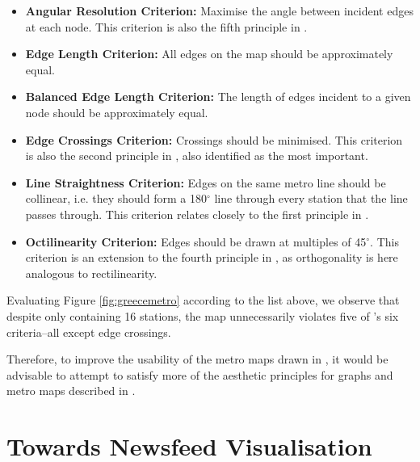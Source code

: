 \begin{itemize}
	\item \textbf{Angular Resolution Criterion:} Maximise the angle between incident edges at each node. This criterion is also the fifth principle in \citep{TheBasisForGraphDrawingAlgorithms}. 
	\item \textbf{Edge Length Criterion:} All edges on the map should be approximately equal.
	\item \textbf{Balanced Edge Length Criterion:} The length of edges incident to a given node should be approximately equal.
	\item \textbf{Edge Crossings Criterion:} Crossings should be minimised. This criterion is also the second principle in \citep{TheBasisForGraphDrawingAlgorithms}, also identified as the most important.
	\item \textbf{Line Straightness Criterion:} Edges on the same metro line should be collinear, i.e. they should form a 180$^{\circ}$ line through every station that the line passes through. This criterion relates closely to the first principle in \citep{TheBasisForGraphDrawingAlgorithms}.
	\item \textbf{Octilinearity Criterion:} Edges should be drawn at multiples of 45$^{\circ}$. This criterion is an extension to the fourth principle in \citep{TheBasisForGraphDrawingAlgorithms}, as orthogonality is here analogous to rectilinearity.
\end{itemize}

Evaluating Figure \ref{fig:greecemetro} according to the list above, we observe that despite only containing 16 stations, the map unnecessarily violates five  of \citeauthor{AutomaticMetroMapLayout}'s six criteria--all except edge crossings.

Therefore, to improve the usability of the metro maps drawn in \citep{ConnectingTheDots, GeneratingInformationMaps, MetroMapsOfScience, InformationCartographyPre}, it would be advisable to attempt to satisfy more of the aesthetic principles for graphs and metro maps described in \citep{TheBasisForGraphDrawingAlgorithms, AutomaticMetroMapLayout}.


\section{Towards Newsfeed Visualisation}

